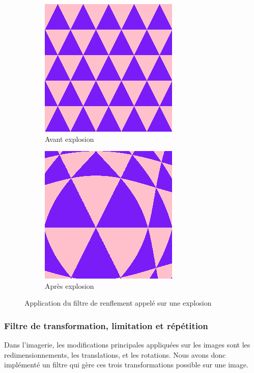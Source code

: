 \documentclass[11pt]{article}
\begin{document}
\begin{figure}[H]
    \centering
    \begin{subfigure}{0.46\textwidth}
    \centering
        \includegraphics[scale=0.45]{bulgeInit.png}
        \caption{Avant explosion}
        \label{subfig:avantbulge}
    \end{subfigure}
    \begin{subfigure}{0.46\textwidth}
    \centering
        \includegraphics[scale=0.45]{bulgeFinal.png}
        \caption{Après explosion}
        \label{subfig:aprèsbulge}
    \end{subfigure}
    \caption{Application du filtre de renflement appelé sur une explosion}
    \label{fig:bulge}
\end{figure}

\subsubsection{Filtre de transformation, limitation et répétition}

Dans l'imagerie, les modifications principales appliquées sur les images sont les redimensionnements, les translations, et les rotations.
Nous avons donc implémenté un filtre qui gère ces trois transformations possible sur une image. \\
\end{document}
